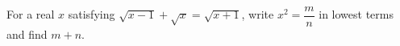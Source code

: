 For a real $x$ satisfying $\sqrt{x-1}+\sqrt x=\sqrt{x+1}$, write $x^2=\dfrac{m}{n}$ in lowest terms and find $m+n$.
